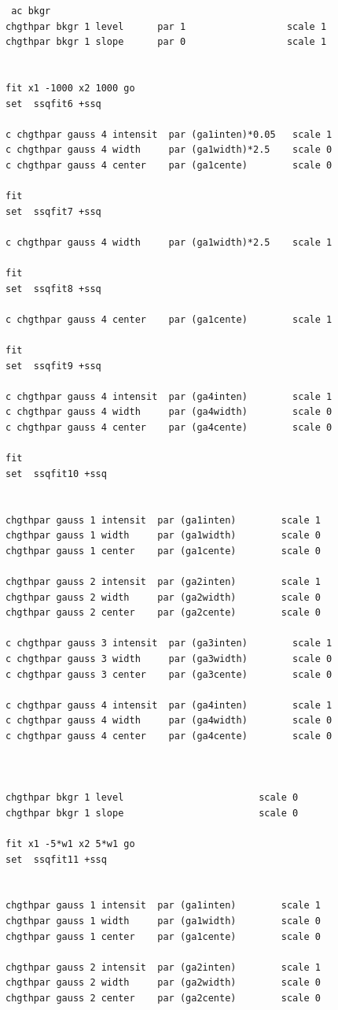 \documentclass[11pt,fleqn]{book} %
\begin{document}
\begin{verbatim}
 ac bkgr
chgthpar bkgr 1 level      par 1                  scale 1
chgthpar bkgr 1 slope      par 0                  scale 1


fit x1 -1000 x2 1000 go
set  ssqfit6 +ssq

c chgthpar gauss 4 intensit  par (ga1inten)*0.05   scale 1
c chgthpar gauss 4 width     par (ga1width)*2.5    scale 0
c chgthpar gauss 4 center    par (ga1cente)        scale 0

fit 
set  ssqfit7 +ssq

c chgthpar gauss 4 width     par (ga1width)*2.5    scale 1

fit 
set  ssqfit8 +ssq

c chgthpar gauss 4 center    par (ga1cente)        scale 1

fit 
set  ssqfit9 +ssq

c chgthpar gauss 4 intensit  par (ga4inten)        scale 1
c chgthpar gauss 4 width     par (ga4width)        scale 0
c chgthpar gauss 4 center    par (ga4cente)        scale 0

fit 
set  ssqfit10 +ssq


chgthpar gauss 1 intensit  par (ga1inten)        scale 1
chgthpar gauss 1 width     par (ga1width)        scale 0
chgthpar gauss 1 center    par (ga1cente)        scale 0

chgthpar gauss 2 intensit  par (ga2inten)        scale 1
chgthpar gauss 2 width     par (ga2width)        scale 0
chgthpar gauss 2 center    par (ga2cente)        scale 0

c chgthpar gauss 3 intensit  par (ga3inten)        scale 1
c chgthpar gauss 3 width     par (ga3width)        scale 0
c chgthpar gauss 3 center    par (ga3cente)        scale 0

c chgthpar gauss 4 intensit  par (ga4inten)        scale 1
c chgthpar gauss 4 width     par (ga4width)        scale 0
c chgthpar gauss 4 center    par (ga4cente)        scale 0



chgthpar bkgr 1 level                        scale 0
chgthpar bkgr 1 slope                        scale 0

fit x1 -5*w1 x2 5*w1 go
set  ssqfit11 +ssq


chgthpar gauss 1 intensit  par (ga1inten)        scale 1
chgthpar gauss 1 width     par (ga1width)        scale 0
chgthpar gauss 1 center    par (ga1cente)        scale 0

chgthpar gauss 2 intensit  par (ga2inten)        scale 1
chgthpar gauss 2 width     par (ga2width)        scale 0
chgthpar gauss 2 center    par (ga2cente)        scale 0


\end{verbatim}
\end{document}
